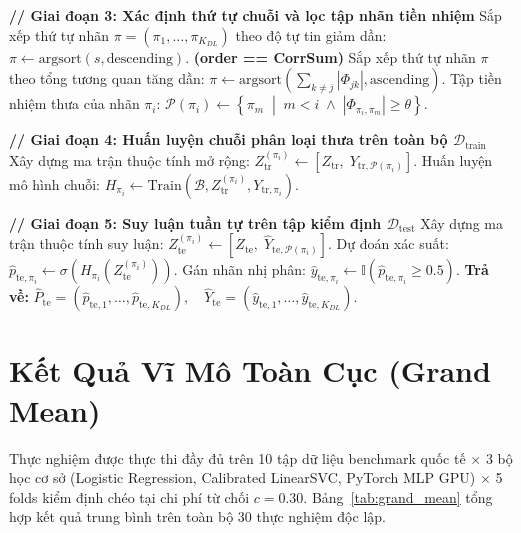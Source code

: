 \documentclass[11pt,a4paper]{article}
\begin{document}
\begin{algorithm}[htbp]
\begin{algorithmic}[1]
\vspace{0.3em}
\Statex \textbf{// Giai đoạn 3: Xác định thứ tự chuỗi và lọc tập nhãn tiền nhiệm}
    \State Sắp xếp thứ tự nhãn $\pi = (\pi_1, \dots, \pi_{K_{DL}})$ theo độ tự tin giảm dần: $\pi \leftarrow \text{argsort}(s, \text{descending})$.
\Else \textbf{ (order == CorrSum)}
    \State Sắp xếp thứ tự nhãn $\pi$ theo tổng tương quan tăng dần: $\pi \leftarrow \text{argsort}\left(\sum_{k \ne j} |\Phi_{jk}|, \text{ascending}\right)$.
\EndIf
{}
    \State Tập tiền nhiệm thưa của nhãn $\pi_i$: $\mathcal{P}(\pi_i) \leftarrow \left\{ \pi_m \;\middle|\; m < i \;\land\; |\Phi_{\pi_i, \pi_m}| \ge \theta \right\}$.
\EndFor

\vspace{0.3em}
\Statex \textbf{// Giai đoạn 4: Huấn luyện chuỗi phân loại thưa trên toàn bộ $\mathcal{D}_{\text{train}}$}
    \State Xây dựng ma trận thuộc tính mở rộng: $Z_{\text{tr}}^{(\pi_i)} \leftarrow [Z_{\text{tr}}, \; Y_{\text{tr}, \mathcal{P}(\pi_i)}]$.
    \State Huấn luyện mô hình chuỗi: $H_{\pi_i} \leftarrow \text{Train}\left(\mathcal{B}, Z_{\text{tr}}^{(\pi_i)}, Y_{\text{tr}, \pi_i}\right)$.
\EndFor

\vspace{0.3em}
\Statex \textbf{// Giai đoạn 5: Suy luận tuần tự trên tập kiểm định $\mathcal{D}_{\text{test}}$}
    \State Xây dựng ma trận thuộc tính suy luận: $Z_{\text{te}}^{(\pi_i)} \leftarrow [Z_{\text{te}}, \; \hat{Y}_{\text{te}, \mathcal{P}(\pi_i)}]$.
    \State Dự đoán xác suất: $\hat{p}_{\text{te}, \pi_i} \leftarrow \sigma\left(H_{\pi_i}(Z_{\text{te}}^{(\pi_i)})\right)$.
    \State Gán nhãn nhị phân: $\hat{y}_{\text{te}, \pi_i} \leftarrow \mathbb{I}(\hat{p}_{\text{te}, \pi_i} \ge 0.5)$.
\EndFor
\State \textbf{Trả về: } $\hat{P}_{\text{te}} = (\hat{p}_{\text{te}, 1}, \dots, \hat{p}_{\text{te}, K_{DL}}), \quad \hat{Y}_{\text{te}} = (\hat{y}_{\text{te}, 1}, \dots, \hat{y}_{\text{te}, K_{DL}})$.
\end{algorithmic}
\end{algorithm}

\section{Kết Quả Vĩ Mô Toàn Cục (Grand Mean)}

Thực nghiệm được thực thi đầy đủ trên 10 tập dữ liệu benchmark quốc tế $\times$ 3 bộ học cơ sở (Logistic Regression, Calibrated LinearSVC, PyTorch MLP GPU) $\times$ 5 folds kiểm định chéo tại chi phí từ chối $c = 0.30$. Bảng~\ref{tab:grand_mean} tổng hợp kết quả trung bình trên toàn bộ 30 thực nghiệm độc lập.
\end{document}

